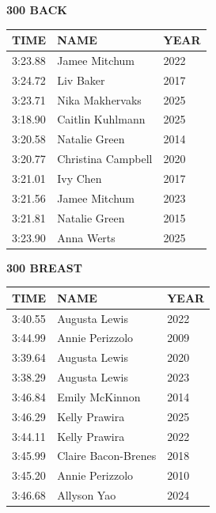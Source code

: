\begin{table}[H]
\centering
\begin{minipage}[t]{0.48\textwidth}
\centering
\textbf{300 BACK}\\[0.1cm]
\begin{tabular}{@{}p{1.8cm}p{2.8cm}p{1.2cm}@{}}
\hline
    \textbf{TIME} & \textbf{NAME} & \textbf{YEAR} \\
\hline
    3:23.88 & Jamee Mitchum & 2022 \\
    3:24.72 & Liv Baker & 2017 \\
    3:23.71 & Nika Makhervaks & 2025 \\
    3:18.90 & Caitlin Kuhlmann & 2025 \\
    3:20.58 & Natalie Green & 2014 \\
    3:20.77 & Christina Campbell & 2020 \\
    3:21.01 & Ivy Chen & 2017 \\
    3:21.56 & Jamee Mitchum & 2023 \\
    3:21.81 & Natalie Green & 2015 \\
    3:23.90 & Anna Werts & 2025 \\
\hline
\end{tabular}
\end{minipage}\hfill
\begin{minipage}[t]{0.48\textwidth}
\centering
\textbf{300 BREAST}\\[0.1cm]
\begin{tabular}{@{}p{1.8cm}p{2.8cm}p{1.2cm}@{}}
\hline
    \textbf{TIME} & \textbf{NAME} & \textbf{YEAR} \\
\hline
    3:40.55 & Augusta Lewis & 2022 \\
    3:44.99 & Annie Perizzolo & 2009 \\
    3:39.64 & Augusta Lewis & 2020 \\
    3:38.29 & Augusta Lewis & 2023 \\
    3:46.84 & Emily McKinnon & 2014 \\
    3:46.29 & Kelly Prawira & 2025 \\
    3:44.11 & Kelly Prawira & 2022 \\
    3:45.99 & Claire Bacon-Brenes & 2018 \\
    3:45.20 & Annie Perizzolo & 2010 \\
    3:46.68 & Allyson Yao & 2024 \\
\hline
\end{tabular}
\end{minipage}
\end{table}


